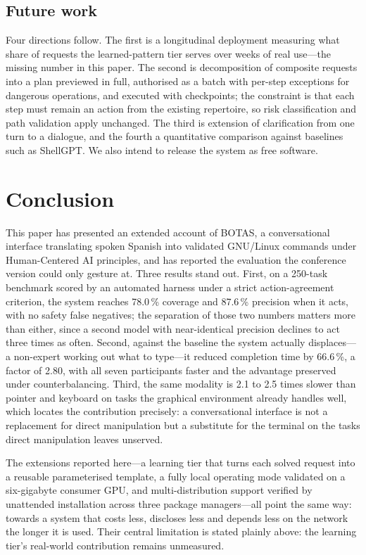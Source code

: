 \documentclass[10pt,a4paper]{article}
\begin{document}
\subsection{Future work}
\label{subsec:future-work}

Four directions follow. The first is a longitudinal deployment measuring what share of requests the learned-pattern tier serves over weeks of real use---the missing number in this paper. The second is decomposition of composite requests into a plan previewed in full, authorised as a batch with per-step exceptions for dangerous operations, and executed with checkpoints; the constraint is that each step must remain an action from the existing repertoire, so risk classification and path validation apply unchanged. The third is extension of clarification from one turn to a dialogue, and the fourth a quantitative comparison against baselines such as ShellGPT. We also intend to release the system as free software.


\section{Conclusion}
\label{sec:conclusion}

This paper has presented an extended account of BOTAS, a conversational interface translating spoken Spanish into validated GNU/Linux commands under Human-Centered AI principles, and has reported the evaluation the conference version could only gesture at. Three results stand out. First, on a 250-task benchmark scored by an automated harness under a strict action-agreement criterion, the system reaches 78.0\,\% coverage and 87.6\,\% precision when it acts, with no safety false negatives; the separation of those two numbers matters more than either, since a second model with near-identical precision declines to act three times as often. Second, against the baseline the system actually displaces---a non-expert working out what to type---it reduced completion time by 66.6\,\%, a factor of 2.80, with all seven participants faster and the advantage preserved under counterbalancing. Third, the same modality is 2.1 to 2.5 times slower than pointer and keyboard on tasks the graphical environment already handles well, which locates the contribution precisely: a conversational interface is not a replacement for direct manipulation but a substitute for the terminal on the tasks direct manipulation leaves unserved.

The extensions reported here---a learning tier that turns each solved request into a reusable parameterised template, a fully local operating mode validated on a six-gigabyte consumer GPU, and multi-distribution support verified by unattended installation across three package managers---all point the same way: towards a system that costs less, discloses less and depends less on the network the longer it is used. Their central limitation is stated plainly above: the learning tier's real-world contribution remains unmeasured.
\end{document}
